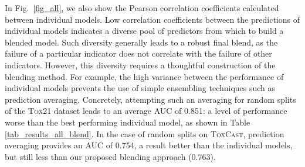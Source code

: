 \documentclass[11pt,a4paper]{article}
\begin{document}
In Fig.~\ref{fig_all}, we also show the Pearson correlation coefficients 
calculated between individual models. 
Low correlation coefficients between the predictions of individual models 
indicates a diverse pool of predictors from which to build a blended model. Such
diversity generally leads to a robust final blend, as the failure of a 
particular indicator does not correlate with the failure of other indicators.
However, this diversity requires a thoughtful construction of the blending 
method. For example, the high variance between the performance of individual models
prevents the use of simple ensembling techniques such as prediction averaging.
Concretely, attempting such an averaging for random splits of the \textsc{Tox21}
dataset leads to an average AUC of 0.851: a level of performance worse than the
best performing individual model, as shown in Table \ref{tab_results_all_blend}.
In the case of random splits on \textsc{ToxCast},
prediction averaging provides an AUC of 0.754, a result better than the individual
models, but still less than our proposed blending approach (0.763).    
\end{document}
